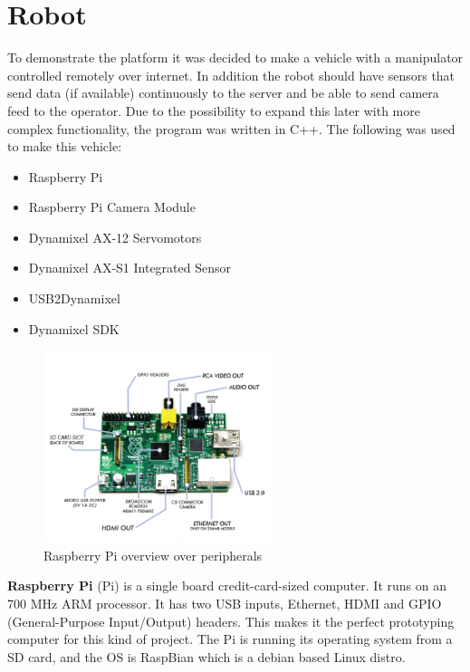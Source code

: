 \section{Robot}
To demonstrate the platform it was decided to make a vehicle with a manipulator controlled remotely over internet. In addition the robot should have sensors that send data (if available) continuously to the server and be able to send camera feed to the operator. Due to the possibility to expand this later with more complex functionality, the program was written in C++.
The following was used to make this vehicle:
\begin{itemize}
    \item Raspberry Pi
    \item Raspberry Pi Camera Module
    \item Dynamixel AX-12 Servomotors
    \item Dynamixel AX-S1 Integrated Sensor
    \item USB2Dynamixel
    \item Dynamixel SDK
\end{itemize}
\vspace{\secspace}

\begin{figure}[H]
    \centering
    \includegraphics[width=0.6\textwidth]{graphics/Raspberry_Pi.png}	
    \caption{Raspberry Pi overview over peripherals}
    \label{fig:RPi}
\end{figure}

\textbf{Raspberry Pi} (Pi) is a single board credit-card-sized computer. It runs on an 700 MHz ARM processor.
It has two USB inputs, Ethernet, HDMI and GPIO (General-Purpose Input/Output) headers. 
This makes it the perfect prototyping computer for this kind of project. 
The Pi is running its operating system from a SD card, and the OS is RaspBian which is a debian based Linux distro.

